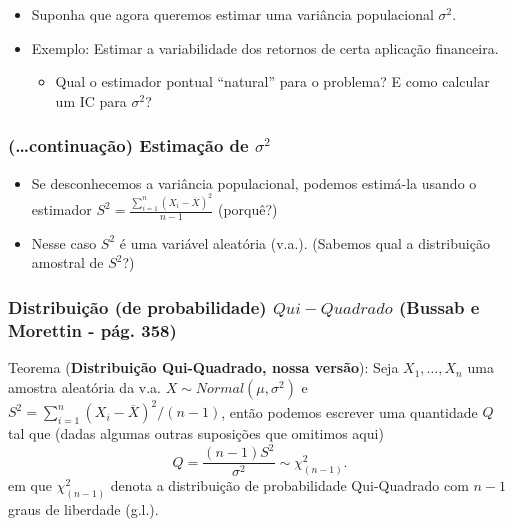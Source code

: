 \documentclass[
]{article}
\providecommand{\tightlist}{%
  \setlength{\itemsep}{0pt}\setlength{\parskip}{0pt}}
\begin{document}
\begin{itemize}
\item
  Suponha que agora queremos estimar uma variância populacional
  \(\sigma^2\).
\item
  Exemplo: Estimar a variabilidade dos retornos de certa aplicação
  financeira.

  \begin{itemize}
  \tightlist
  \item
    Qual o estimador pontual ``natural'' para o problema? E como
    calcular um IC para \(\sigma^2\)?
  \end{itemize}
\end{itemize}

\hypertarget{continuauxe7uxe3o-estimauxe7uxe3o-de-sigma2}{%
\subsubsection{\texorpdfstring{(\ldots continuação) Estimação de
\(\sigma^2\)}{(\ldots continuação) Estimação de \textbackslash sigma\^{}2}}\label{continuauxe7uxe3o-estimauxe7uxe3o-de-sigma2}}

\begin{itemize}
\item
  Se desconhecemos a variância populacional, podemos estimá-la usando o
  estimador \(S^2 = \frac{\sum_{i=1}^n (X_i - \overline X)^2}{n-1}\)
  (porquê?)
\item
  Nesse caso \(S^2\) é uma variável aleatória (v.a.). (Sabemos qual a
  distribuição amostral de \(S^2\)?)
\end{itemize}

\vspace{0.5cm}

\hypertarget{distribuiuxe7uxe3o-de-probabilidade-qui-quadrado-bussab-e-morettin---puxe1g.-358}{%
\subsubsection{\texorpdfstring{Distribuição (de probabilidade)
\(Qui-Quadrado\) (Bussab e Morettin - pág.
358)}{Distribuição (de probabilidade) Qui-Quadrado (Bussab e Morettin - pág. 358)}}\label{distribuiuxe7uxe3o-de-probabilidade-qui-quadrado-bussab-e-morettin---puxe1g.-358}}

Teorema (\textbf{Distribuição Qui-Quadrado, nossa versão}): Seja
\(X_1, \ldots, X_n\) uma amostra aleatória da v.a.
\(X \sim Normal(\mu,\sigma^2)\) e
\(S^2 = \sum_{i=1}^n (X_i - \overline X)^2 / (n-1)\), então podemos
escrever uma quantidade \(Q\) tal que (dadas algumas outras suposições
que omitimos aqui)
\[ Q = \frac{(n-1) S^2}{\sigma^2} \sim \chi^2_{(n-1)}.\] em que
\(\chi^2_{(n-1)}\) denota a distribuição de probabilidade Qui-Quadrado
com \(n-1\) graus de liberdade (g.l.).
\end{document}
